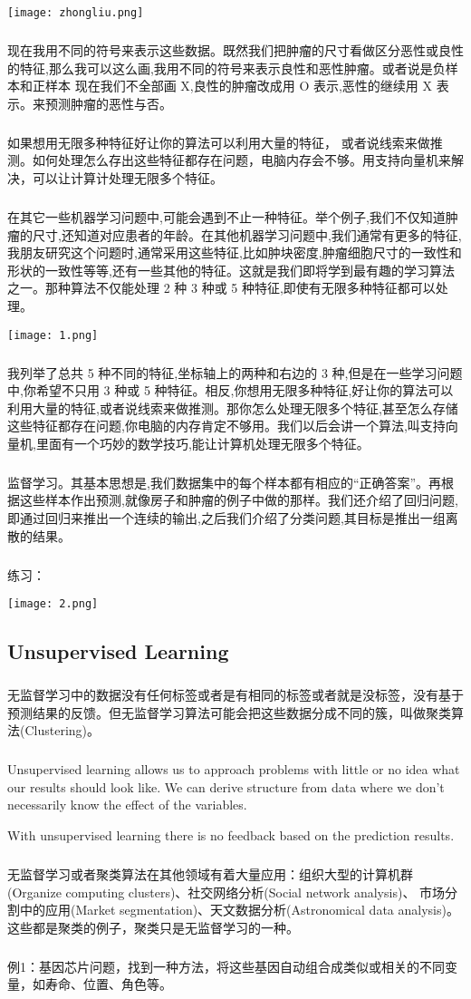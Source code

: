 \documentclass{article}
\begin{document}
\begin{CJK}{UTF8}{gbsn}
\texttt{[image: zhongliu.png]}
\subparagraph*{}
现在我用不同的符号来表示这些数据。既然我们把肿瘤的尺寸看做区分恶性或良性的特征,那么我可以这么画,我用不同的符号来表示良性和恶性肿瘤。或者说是负样本和正样本
现在我们不全部画 X,良性的肿瘤改成用 O 表示,恶性的继续用 X 表示。来预测肿瘤的恶性与否。
\subparagraph*{}
如果想用无限多种特征好让你的算法可以利用大量的特征，
或者说线索来做推测。如何处理怎么存出这些特征都存在问题，电脑内存会不够。用支持向量机来解决，可以让计算计处理无限多个特征。
\subparagraph*{}
在其它一些机器学习问题中,可能会遇到不止一种特征。举个例子,我们不仅知道肿瘤的尺寸,还知道对应患者的年龄。在其他机器学习问题中,我们通常有更多的特征,我朋友研究这个问题时,通常采用这些特征,比如肿块密度,肿瘤细胞尺寸的一致性和形状的一致性等等,还有一些其他的特征。这就是我们即将学到最有趣的学习算法之一。那种算法不仅能处理 2 种 3 种或 5 种特征,即使有无限多种特征都可以处理。

\texttt{[image: 1.png]}
\subparagraph*{}
我列举了总共 5 种不同的特征,坐标轴上的两种和右边的 3 种,但是在一些学习问题中,你希望不只用 3 种或 5 种特征。相反,你想用无限多种特征,好让你的算法可以
利用大量的特征,或者说线索来做推测。那你怎么处理无限多个特征,甚至怎么存储这些特征都存在问题,你电脑的内存肯定不够用。我们以后会讲一个算法,叫支持向量机,里面有一个巧妙的数学技巧,能让计算机处理无限多个特征。
\subparagraph*{}
监督学习。其基本思想是,我们数据集中的每个样本都有相应的“正确答案”。再根据这些样本作出预测,就像房子和肿瘤的例子中做的那样。我们还介绍了回归问题,即通过回归来推出一个连续的输出,之后我们介绍了分类问题,其目标是推出一组离散的结果。
\subparagraph*{}
练习：

\texttt{[image: 2.png]}
\subsection{Unsupervised Learning}
\subparagraph*{}
无监督学习中的数据没有任何标签或者是有相同的标签或者就是没标签，没有基于预测结果的反馈。但无监督学习算法可能会把这些数据分成不同的簇，叫做聚类算法(Clustering)。
\subparagraph*{}
Unsupervised learning allows us to approach problems with little or no idea what our results should look like. We can derive structure from data where we don't necessarily know the effect of the variables.

With unsupervised learning there is no feedback based on the prediction results.
\subparagraph*{}
无监督学习或者聚类算法在其他领域有着大量应用：组织大型的计算机群(Organize computing clusters)、社交网络分析(Social network analysis)、
市场分割中的应用(Market segmentation)、天文数据分析(Astronomical data analysis)。这些都是聚类的例子，聚类只是无监督学习的一种。
\subparagraph*{}
例1：基因芯片问题，找到一种方法，将这些基因自动组合成类似或相关的不同变量，如寿命、位置、角色等。


\end{CJK}
\end{document}
